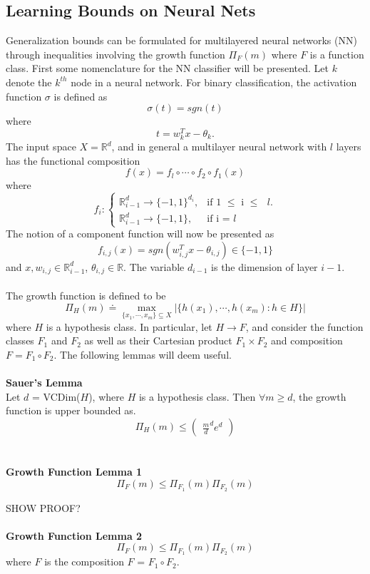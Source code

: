 \documentclass{article} %
\begin{document}
\subsection{Learning Bounds on Neural Nets}
Generalization bounds can be formulated for multilayered neural networks (NN) through inequalities involving the growth function $\Pi_F(m)$ where $F$ is a function class. First some nomenclature for the NN classifier will be presented. Let $k$ denote the $k^{th}$ node in a neural network. For binary classification, the activation function $\sigma$ is defined as
$$
\sigma(t) = sgn(t)
$$
where
$$
t = w_k^Tx - \theta_k.
$$
The input space $X = \mathbb{R}^d$, and in general a multilayer neural network with $l$ layers has the functional composition
$$
f(x) = f_l \circ \cdots \circ f_2 \circ f_1 (x)
$$
where
$$
f_i : \begin{cases}
    \mathbb{R}^d_{i-1} \rightarrow \{-1,1\}^{d_i}, & \text{if 1 $\leq$ i $\leq$ $l$}.\\
    \mathbb{R}^d_{i-1} \rightarrow \{-1,1\}, & \text{if i = $l$}
  \end{cases}
$$
The notion of a component function will now be presented as
$$
f_{i,j}(x) = sgn(w_{i,j}^Tx - \theta_{i,j}) \in \{-1,1\}
$$
and $x,w_{i,j} \in \mathbb{R}^d_{i-1}$, $\theta_{i,j} \in \mathbb{R}$. The variable $d_{i-1}$ is the dimension of layer $i-1$.
\\
\\
The growth function is defined to be
$$
\Pi_H(m) \doteq \max_{\{x_1,\cdots,x_m\} \subseteq X} |\{h(x_1),\cdots,h(x_m) : h \in H \} |
$$
where $H$ is a hypothesis class. In particular, let $H \rightarrow F$, and consider the function classes $F_1$ and $F_2$ as well as their Cartesian product $F_1 \times F_2$ and composition $F = F_1 \circ F_2$. The following lemmas will deem useful.
\\
\\
\textbf{Sauer's Lemma}
\\
Let $d$ = VCDim($H$), where $H$ is a hypothesis class. Then $\forall m \geq d$, the growth function is upper bounded as.
$$
\Pi_H(m) \leq \begin{pmatrix}
\frac{m}{d}^de^d
\end{pmatrix}
$$
\\
\\
\textbf{Growth Function Lemma 1}
$$
\Pi_F(m) \leq \Pi_{F_1}(m)\Pi_{F_2}(m)
$$

SHOW PROOF?
\\
\\
\textbf{Growth Function Lemma 2}
$$
\Pi_F(m) \leq \Pi_{F_1}(m)\Pi_{F_2}(m)
$$
where $F$ is the composition $F$ = $F_1 \circ F_2$.
\\
\end{document}
